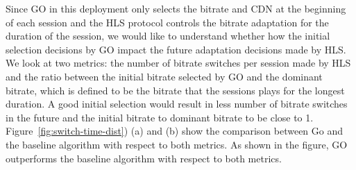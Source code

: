 Since GO in this deployment only selects the bitrate and CDN at the beginning of each session and the HLS protocol controls the bitrate adaptation for the duration of the session, we would like to understand whether how the initial selection decisions by GO impact the future adaptation decisions made by HLS. 
We look at two metrics: the number of bitrate switches per session made by HLS and the ratio between the initial bitrate selected by GO and the dominant bitrate, which is defined to be the bitrate that the sessions plays for the longest duration. A good initial selection would result in less number of bitrate switches in the future and the initial bitrate to dominant bitrate to be close to 1. 
Figure~\ref{fig:switch-time-dist}) (a) and (b) show the comparison between Go and the baseline algorithm with respect to both metrics.  As shown in the figure, GO outperforms the baseline algorithm with respect to both metrics. 



\begin{figure}[h!]
\centering
{}
\hspace{-0.6cm}
\label{fig:bitrate-stability}
\end{figure}



